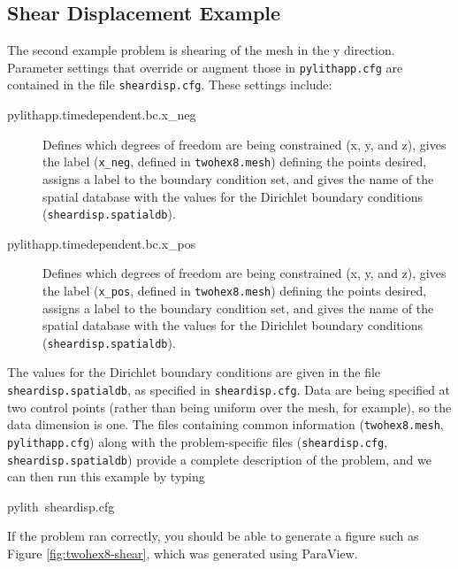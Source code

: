 \subsection{Shear Displacement Example}

The second example problem is shearing of the mesh in the y direction.
Parameter settings that override or augment those in \texttt{pylithapp.cfg}
are contained in the file \texttt{sheardisp.cfg}. These settings include:
\begin{description}
\item [{pylithapp.timedependent.bc.x\_neg}] Defines which degrees of freedom
are being constrained (x, y, and z), gives the label (\texttt{x\_neg},
defined in \texttt{twohex8.mesh}) defining the points desired, assigns
a label to the boundary condition set, and gives the name of the spatial
database with the values for the Dirichlet boundary conditions (\texttt{sheardisp.spatialdb}).
\item [{pylithapp.timedependent.bc.x\_pos}] Defines which degrees of freedom
are being constrained (x, y, and z), gives the label (\texttt{x\_pos},
defined in \texttt{twohex8.mesh}) defining the points desired, assigns
a label to the boundary condition set, and gives the name of the spatial
database with the values for the Dirichlet boundary conditions (\texttt{sheardisp.spatialdb}).
\end{description}
The values for the Dirichlet boundary conditions are given in the
file \texttt{sheardisp.spatialdb}, as specified in \texttt{sheardisp.cfg}.
Data are being specified at two control points (rather than being
uniform over the mesh, for example), so the data dimension is one.
The files containing common information (\texttt{twohex8.mesh}, \texttt{pylithapp.cfg})
along with the problem-specific files (\texttt{sheardisp.cfg}, \texttt{sheardisp.spatialdb})
provide a complete description of the problem, and we can then run
this example by typing
\begin{lyxcode}
pylith~sheardisp.cfg
\end{lyxcode}
If the problem ran correctly, you should be able to generate a figure
such as Figure \vref{fig:twohex8-shear}, which was generated using
ParaView.

